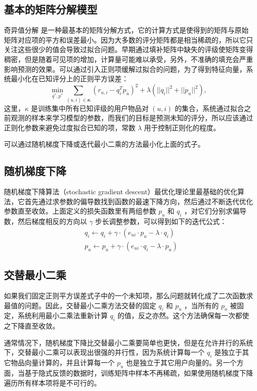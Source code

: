 \subsection{基本的矩阵分解模型}
奇异值分解 \cite{paterek2007improving} 是一种最基本的矩阵分解方式，它的计算方式是使得到的矩阵与原始矩阵对应项的平方和误差最小。因为大多数的评分矩阵都是相当稀疏的，所以它只关注这些很少的值会导致过拟合问题。早期通过填补矩阵中缺失的评级使矩阵变得稠密，但是随着可见项的增加，计算量可能难以承受，另外，不准确的填充会严重影响预测的效果。可以通过引入正则项缓解过拟合的问题，为了得到特征向量，系统最小化在已知评分上的正则平方误差：
\begin{equation}
\min_{q^*, p^*} {\sum\limits_{(u,i) \in 𝜿} {{(r_{u,i}-q_i^Tp_u)}^2 + \lambda(||q_i||^2 + ||p_u||^2)} } ,
\end{equation}
这里，$\kappa$ 是训练集中所有已知评级的用户物品对 $(u,i)$ 的集合，系统通过拟合之前观测的样本来学习模型的参数，而我们的目标是预测未知的评分，所以应该通过正则化参数来避免过度拟合已知的项，常数 $\lambda$ 用于控制正则化的程度。

可以通过随机梯度下降或迭代最小二乘的方法最小化上面的式子。


\subsection{随机梯度下降}
随机梯度下降算法（stochastic gradient descent）最优化理论里最基础的优化算法，它首先通过求参数的偏导数找到函数的最速下降方向，然后通过不断迭代优化参数直至收敛。上面定义的损失函数里有两组参数 $p_{u}$ 和 $q_{i}$ ，对它们分别求偏导数，然后梯度相反的方向以  $𝛾$ 步长调整参数，可以得到如下的迭代公式：
\begin{equation}
\begin{aligned}
&q_i \leftarrow q_i + 𝛾 \cdot(e_{ui} \cdot p_u -\lambda \cdot q_i)\\
&p_u \leftarrow p_u + 𝛾 \cdot(e_{ui} \cdot q_i- \lambda \cdot p_u)
\end{aligned}
\end{equation}

\subsection{交替最小二乘}
如果我们固定正则平方误差式子中的一个未知项，那么问题就转化成了二次函数求最值的问题。因此，交替最小二乘方法交替的固定 $q_i$ 和 $p_u$ ，当所有的 $p_u$ 被固定，系统利用最小二乘法重新计算 $q_i$ 的值，反之亦然。这个方法确保每一次都使之下降直至收敛。

通常情况下，随机梯度下降比交替最小二乘要简单也更快，但是在允许并行的系统下，交替最小二乘可以表现出很强的并行性，因为系统计算每一个 $q_i$ 是独立于其它物品向量计算的，并且计算每一个 $p_u$ 也是独立于其它用户向量的。另一个方面，当基于隐式反馈的数据时，训练矩阵中样本不再稀疏，如果使用随机梯度下降遍历所有样本项将是不可行的。

